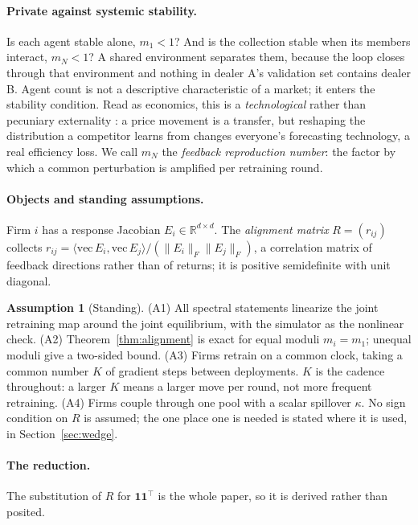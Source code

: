 \documentclass{article}
\theoremstyle{plain}
\theoremstyle{definition}
\newtheorem{assumption}{Assumption}
\newcommand{\mN}{m_N}
\begin{document}
\paragraph{Private against systemic stability.}
Is each agent stable alone, $m_1 < 1$? And is the collection stable when its members interact, $\mN < 1$? A shared environment separates them, because the loop closes through that environment and nothing in dealer A's validation set contains dealer B. Agent count is not a descriptive characteristic of a market; it enters the stability condition. Read as economics, this is a \emph{technological} rather than pecuniary externality \citep{buchanan1962}: a price movement is a transfer, but reshaping the distribution a competitor learns from changes everyone's forecasting technology, a real efficiency loss. We call $\mN$ the \emph{feedback reproduction number}: the factor by which a common perturbation is amplified per retraining round.

\paragraph{Objects and standing assumptions.}
Firm $i$ has a response Jacobian $E_i \in \mathbb{R}^{d\times d}$. The \emph{alignment matrix} $R = (r_{ij})$ collects $r_{ij} = \langle \mathrm{vec}\,E_i, \mathrm{vec}\,E_j\rangle / (\|E_i\|_F \|E_j\|_F)$, a correlation matrix of feedback directions rather than of returns; it is positive semidefinite with unit diagonal.

\begin{assumption}[Standing]
\label{ass:standing}
(A1) All spectral statements linearize the joint retraining map around the joint equilibrium, with the simulator as the nonlinear check. (A2) Theorem~\ref{thm:alignment} is exact for equal moduli $m_i = m_1$; unequal moduli give a two-sided bound. (A3) Firms retrain on a common clock, taking a common number $K$ of gradient steps between deployments. $K$ is the cadence throughout: a larger $K$ means a larger move per round, not more frequent retraining. (A4) Firms couple through one pool with a scalar spillover $\kappa$. No sign condition on $R$ is assumed; the one place one is needed is stated where it is used, in Section~\ref{sec:wedge}.
\end{assumption}

\paragraph{The reduction.}
The substitution of $R$ for $\mathbf{1}\mathbf{1}^{\top}$ is the whole paper, so it is derived rather than posited.
\end{document}
